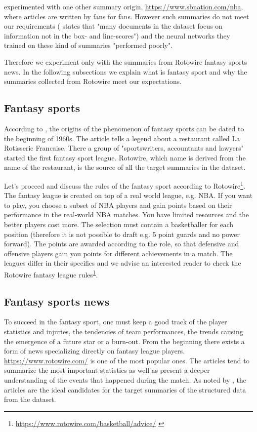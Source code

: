 \citet{wiseman2017} experimented with one other summary origin, \url{https://www.sbnation.com/nba}, where articles are written by fans for fans. However such summaries do not meet our requirements (\citet{wiseman2017} states that "many documents in the dataset focus on information not in the box- and line-scores") and the neural networks they trained on these kind of summaries "performed poorly".

Therefore we experiment only with the summaries from Rotowire fantasy sports news. In the following subsections we explain what is fantasy sport and why the summaries collected from Rotowire meet our expectations.

\subsection{Fantasy sports}

According to \citep{Tozzi1999}, the origins of the phenomenon of fantasy sports can be dated to the beginning of 1960s. The article tells a legend about a restaurant called La Rotisserie Francaise. There a group of "sportswriters, accountants and lawyers" started the first fantasy sport league. Rotowire, which name is derived from the name of the restaurant, is the source of all the target summaries in the dataset.

Let's proceed and discuss the rules of the fantasy sport according to Rotowire\footnote{\url{https://www.rotowire.com/basketball/advice/} \label{footnote_2_fs}}. The fantasy league is created on top of a real world league, e.g. NBA. If you want to play, you choose a subset of NBA players and gain points based on their performance in the real-world NBA matches. You have limited resources and the better players cost more. The selection must contain a basketballer for each position (therefore it is not possible to draft e.g. 5 point guards and no power forward). The points are awarded according to the role, so that defensive and offensive players gain you points for different achievements in a match. The leagues differ in their specifics and we advise an interested reader to check the Rotowire fantasy league rules\textsuperscript{\ref{footnote_2_fs}}.

\subsection{Fantasy sports news}

To succeed in the fantasy sport, one must keep a good track of the player statistics and injuries, the tendencies of team performances, the trends causing the emergence of a future star or a burn-out. From the beginning there exists a form of news specializing directly on fantasy league players. \url{https://www.rotowire.com/} is one of the most popular ones. The articles tend to summarize the most important statistics as well as present a deeper understanding of the events that happened during the match. As noted by \citet{wiseman2017}, the articles are the ideal candidates for the target summaries of the structured data from the dataset.

